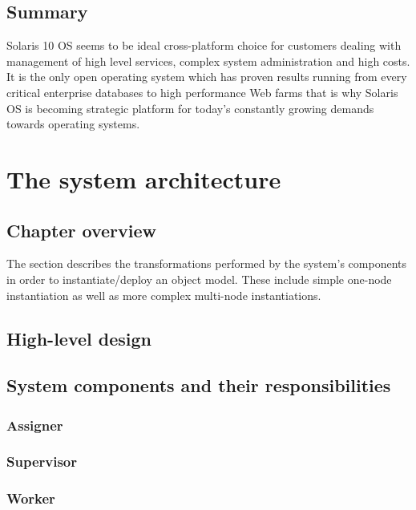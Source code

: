 \documentclass[11pt]{book}
\begin{document}
    \section*{Summary}

      Solaris 10 OS seems to be ideal cross-platform choice for customers dealing with management of high level
      services, complex system administration and high costs. It is the only open operating system which has
      proven results running from every critical enterprise databases to high performance Web farms that is
      why Solaris OS is becoming strategic platform for today's constantly growing demands towards operating
      systems. 


  \chapter{The system architecture}

    \section*{Chapter overview}

      The  section describes the transformations performed by the system's components in order
      to instantiate/deploy an object model. These include simple one-node instantiation as well as more complex
      multi-node instantiations.



    \section{High-level design}


    \section{System components and their responsibilities}

      \subsection{Assigner}

      \subsection{Supervisor}

      \subsection{Worker}
\end{document}
